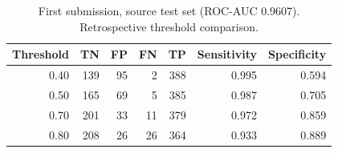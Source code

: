 \documentclass[12pt,letterpaper]{article}
\begin{document}
\begin{table}[htbp]
\centering
\caption{First submission, source test set (ROC-AUC 0.9607). Retrospective threshold comparison.}
\label{tab:previous}
\small
\begin{tabular}{rrrrrrr}
\toprule
Threshold & TN & FP & FN & TP & Sensitivity & Specificity \\
\midrule
0.40 & 139 & 95 & 2 & 388 & 0.995 & 0.594 \\
0.50 & 165 & 69 & 5 & 385 & 0.987 & 0.705 \\
0.70 & 201 & 33 & 11 & 379 & 0.972 & 0.859 \\
0.80 & 208 & 26 & 26 & 364 & 0.933 & 0.889 \\
\bottomrule
\end{tabular}
\end{table}
\end{document}

